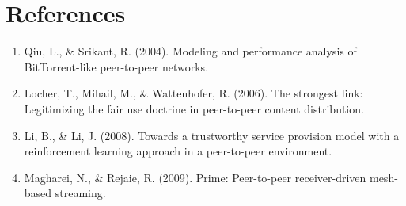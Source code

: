 \documentclass{article}
\begin{document}
\section{References}
\begin{enumerate}
\item Qiu, L., \& Srikant, R. (2004). Modeling and performance analysis of BitTorrent-like peer-to-peer networks.
\item Locher, T., Mihail, M., \& Wattenhofer, R. (2006). The strongest link: Legitimizing the fair use doctrine in peer-to-peer content distribution.
\item Li, B., \& Li, J. (2008). Towards a trustworthy service provision model with a reinforcement learning approach in a peer-to-peer environment.
\item Magharei, N., \& Rejaie, R. (2009). Prime: Peer-to-peer receiver-driven mesh-based streaming.

\end{enumerate}
\end{document}
